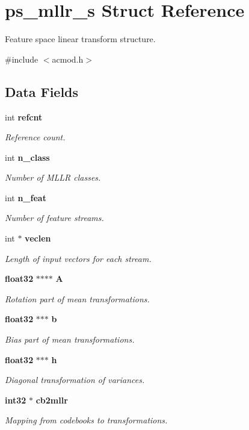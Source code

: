 \section{ps\-\_\-mllr\-\_\-s \-Struct \-Reference}
\label{structps__mllr__s}


\-Feature space linear transform structure.  




{\ttfamily \#include $<$acmod.\-h$>$}

\subsection*{\-Data \-Fields}
\begin{DoxyCompactItemize}
\item 
int {\bf refcnt}
\begin{DoxyCompactList}\small\item\em \-Reference count. \end{DoxyCompactList}\item 
int {\bf n\-\_\-class}
\begin{DoxyCompactList}\small\item\em \-Number of \-M\-L\-L\-R classes. \end{DoxyCompactList}\item 
int {\bf n\-\_\-feat}
\begin{DoxyCompactList}\small\item\em \-Number of feature streams. \end{DoxyCompactList}\item 
int $\ast$ {\bf veclen}
\begin{DoxyCompactList}\small\item\em \-Length of input vectors for each stream. \end{DoxyCompactList}\item 
{\bf float32} $\ast$$\ast$$\ast$$\ast$ {\bf \-A}
\begin{DoxyCompactList}\small\item\em \-Rotation part of mean transformations. \end{DoxyCompactList}\item 
{\bf float32} $\ast$$\ast$$\ast$ {\bf b}
\begin{DoxyCompactList}\small\item\em \-Bias part of mean transformations. \end{DoxyCompactList}\item 
{\bf float32} $\ast$$\ast$$\ast$ {\bf h}
\begin{DoxyCompactList}\small\item\em \-Diagonal transformation of variances. \end{DoxyCompactList}\item 
{\bf int32} $\ast$ {\bf cb2mllr}
\begin{DoxyCompactList}\small\item\em \-Mapping from codebooks to transformations. \end{DoxyCompactList}\end{DoxyCompactItemize}


